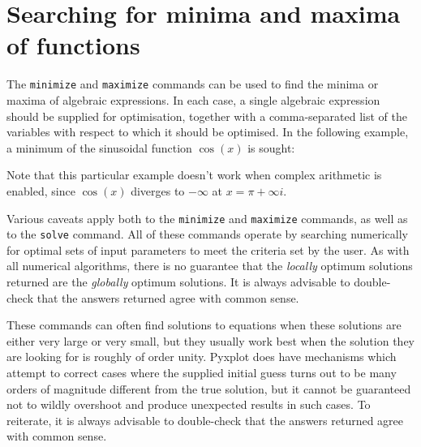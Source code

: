 \vspace{3mm}

\vspace{3mm}

\section{Searching for minima and maxima of functions}

The  {\tt minimize} and {\tt maximize}
commands can be used to find the minima or maxima of algebraic expressions. In
each case, a single algebraic expression should be supplied for optimisation,
together with a comma-separated list of the variables with respect to which it
should be optimised. In the following example, a minimum of the sinusoidal
function $\cos(x)$ is sought:

\vspace{3mm}

\vspace{3mm}

\noindent Note that this particular example doesn't work when complex
arithmetic is enabled, since $\cos(x)$ diverges to $-\infty$ at $x=\pi+\infty
i$.

Various caveats apply both to the {\tt minimize} and {\tt maximize} commands,
as well as to the {\tt solve} command.  All of these commands operate by
searching numerically for optimal sets of input parameters to meet the criteria
set by the user. As with all numerical algorithms, there is no guarantee that
the {\it locally} optimum solutions returned are the {\it globally} optimum
solutions. It is always advisable to double-check that the answers returned
agree with common sense.

These commands can often find solutions to equations when these solutions are
either very large or very small, but they usually work best when the solution
they are looking for is roughly of order unity.  Pyxplot does have mechanisms
which attempt to correct cases where the supplied initial guess turns out to be
many orders of magnitude different from the true solution, but it cannot be
guaranteed not to wildly overshoot and produce unexpected results in such
cases.  To reiterate, it is always advisable to double-check that the answers
returned agree with common sense.

